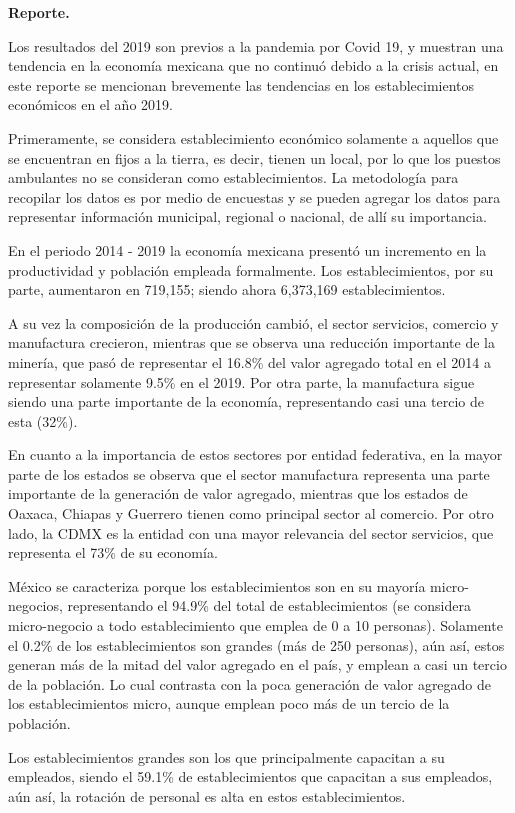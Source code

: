 \textbf{Reporte.}

Los resultados del 2019 son previos a la pandemia por Covid 19, y muestran una tendencia en la economía mexicana que no continuó debido a la crisis actual, en este reporte se mencionan brevemente las tendencias en los establecimientos económicos en el año 2019.

Primeramente, se considera establecimiento económico solamente a aquellos que se encuentran en fijos a la tierra, es decir, tienen un local, por lo que los puestos ambulantes no se consideran como establecimientos. La metodología para recopilar los datos es por medio de encuestas y se pueden agregar los datos para representar información municipal, regional o nacional, de allí su importancia.


En el periodo 2014 - 2019 la economía mexicana presentó un incremento en la productividad y población empleada formalmente. Los establecimientos, por su parte, aumentaron en 719,155; siendo ahora 6,373,169 establecimientos.

A su vez la composición de la producción cambió, el sector servicios, comercio y manufactura crecieron, mientras que se observa una reducción importante de la minería, que pasó de representar el 16.8\% del valor agregado total en el 2014 a representar solamente 9.5\% en el 2019. Por otra parte, la manufactura sigue siendo una parte importante de la economía, representando casi una tercio de esta (32\%).

En cuanto a la importancia de estos sectores por entidad federativa, en la mayor parte de los estados se observa que el sector manufactura representa una parte importante de la generación de valor agregado, mientras que los estados de Oaxaca, Chiapas y Guerrero tienen como principal sector al comercio. Por otro lado, la CDMX es la entidad con una mayor relevancia del sector servicios, que representa el 73\% de su economía.

México se caracteriza porque los establecimientos son en su mayoría micro-negocios, representando el 94.9\% del total de establecimientos (se considera micro-negocio a todo establecimiento que emplea de 0 a 10 personas).
Solamente el 0.2\% de los establecimientos son grandes (más de 250 personas), aún así, estos generan más de la mitad del valor agregado en el país, y emplean a casi un tercio de la población. Lo cual contrasta con la poca generación de valor agregado de los establecimientos micro, aunque emplean poco más de un tercio de la población.

Los establecimientos grandes son los que principalmente capacitan a su empleados, siendo el 59.1\% de establecimientos que capacitan a sus empleados, aún así, la rotación de personal es alta en estos establecimientos.

